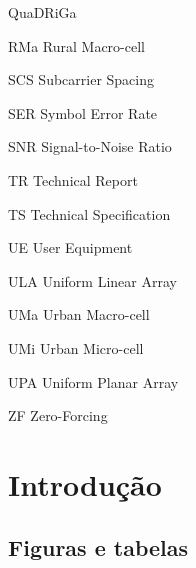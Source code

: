 \documentclass[ecp,tc,english]{iiufrgs}
\begin{document}
\begin{listofabbrv}{QuaDRiGa}
    \item[RMa] Rural Macro-cell
    \item[SCS] Subcarrier Spacing
    \item[SER] Symbol Error Rate
    \item[SNR] Signal-to-Noise Ratio
    \item[TR] Technical Report
    \item[TS] Technical Specification
    \item[UE] User Equipment
    \item[ULA] Uniform Linear Array
    \item[UMa] Urban Macro-cell
    \item[UMi] Urban Micro-cell
    \item[UPA] Uniform Planar Array
    \item[ZF] Zero-Forcing
\end{listofabbrv}


\tableofcontents


\chapter{Introdução}

\section{Figuras e tabelas}

% 
\end{document}

